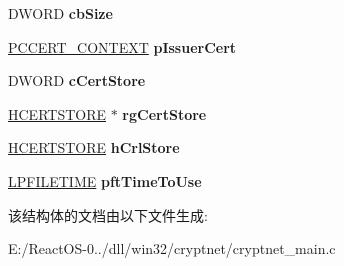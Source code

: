 \begin{DoxyCompactItemize}
\item 
\mbox{\label{struct___c_e_r_t___r_e_v_o_c_a_t_i_o_n___p_a_r_a___n_o___e_x_t_r_a___f_i_e_l_d_s_a65caaf7d48a89e7504f71cbbab6d3e34}} 
D\+W\+O\+RD {\bfseries cb\+Size}
\item 
\mbox{\label{struct___c_e_r_t___r_e_v_o_c_a_t_i_o_n___p_a_r_a___n_o___e_x_t_r_a___f_i_e_l_d_s_ad62c6bd5be9fc38ba8969ad3c101c80e}} 
\hyperlink{struct___c_e_r_t___c_o_n_t_e_x_t}{P\+C\+C\+E\+R\+T\+\_\+\+C\+O\+N\+T\+E\+XT} {\bfseries p\+Issuer\+Cert}
\item 
\mbox{\label{struct___c_e_r_t___r_e_v_o_c_a_t_i_o_n___p_a_r_a___n_o___e_x_t_r_a___f_i_e_l_d_s_a5ad35ef6b7869d5c10aa212cc6f6bbf2}} 
D\+W\+O\+RD {\bfseries c\+Cert\+Store}
\item 
\mbox{\label{struct___c_e_r_t___r_e_v_o_c_a_t_i_o_n___p_a_r_a___n_o___e_x_t_r_a___f_i_e_l_d_s_ab323d1937a9d2edf0335733ba5644a0d}} 
\hyperlink{interfacevoid}{H\+C\+E\+R\+T\+S\+T\+O\+RE} $\ast$ {\bfseries rg\+Cert\+Store}
\item 
\mbox{\label{struct___c_e_r_t___r_e_v_o_c_a_t_i_o_n___p_a_r_a___n_o___e_x_t_r_a___f_i_e_l_d_s_a7a345445412e461e460a5a85da64a548}} 
\hyperlink{interfacevoid}{H\+C\+E\+R\+T\+S\+T\+O\+RE} {\bfseries h\+Crl\+Store}
\item 
\mbox{\label{struct___c_e_r_t___r_e_v_o_c_a_t_i_o_n___p_a_r_a___n_o___e_x_t_r_a___f_i_e_l_d_s_aadf5e99bc666ee2c7ac724f753298abc}} 
\hyperlink{struct___f_i_l_e_t_i_m_e}{L\+P\+F\+I\+L\+E\+T\+I\+ME} {\bfseries pft\+Time\+To\+Use}
\end{DoxyCompactItemize}


该结构体的文档由以下文件生成\+:\begin{DoxyCompactItemize}
\item 
E\+:/\+React\+O\+S-\/0../dll/win32/cryptnet/cryptnet\+\_\+main.\+c\end{DoxyCompactItemize}
